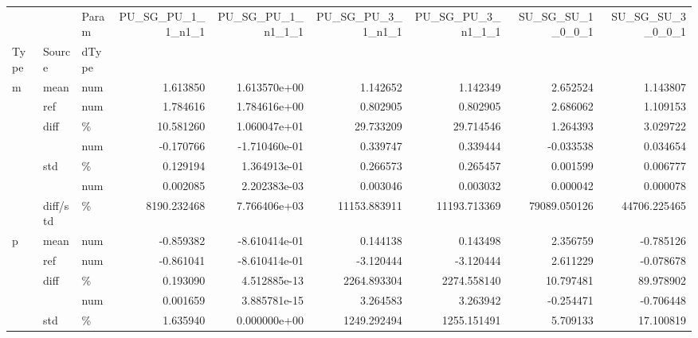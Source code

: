 \begin{tabular}{lllrrrrrr}
\toprule
   &          & Param &  PU\_SG\_PU\_1\_1\_n1\_1 &  PU\_SG\_PU\_1\_n1\_1\_1 &  PU\_SG\_PU\_3\_1\_n1\_1 &  PU\_SG\_PU\_3\_n1\_1\_1 &  SU\_SG\_SU\_1\_0\_0\_1 &  SU\_SG\_SU\_3\_0\_0\_1 \\
Type & Source & dType &                    &                    &                    &                    &                   &                   \\
\midrule
m & mean & num &           1.613850 &       1.613570e+00 &           1.142652 &           1.142349 &          2.652524 &          1.143807 \\
   & ref & num &           1.784616 &       1.784616e+00 &           0.802905 &           0.802905 &          2.686062 &          1.109153 \\
   & diff & \% &          10.581260 &       1.060047e+01 &          29.733209 &          29.714546 &          1.264393 &          3.029722 \\
   &          & num &          -0.170766 &      -1.710460e-01 &           0.339747 &           0.339444 &         -0.033538 &          0.034654 \\
   & std & \% &           0.129194 &       1.364913e-01 &           0.266573 &           0.265457 &          0.001599 &          0.006777 \\
   &          & num &           0.002085 &       2.202383e-03 &           0.003046 &           0.003032 &          0.000042 &          0.000078 \\
   & diff/std & \% &        8190.232468 &       7.766406e+03 &       11153.883911 &       11193.713369 &      79089.050126 &      44706.225465 \\
p & mean & num &          -0.859382 &      -8.610414e-01 &           0.144138 &           0.143498 &          2.356759 &         -0.785126 \\
   & ref & num &          -0.861041 &      -8.610414e-01 &          -3.120444 &          -3.120444 &          2.611229 &         -0.078678 \\
   & diff & \% &           0.193090 &       4.512885e-13 &        2264.893304 &        2274.558140 &         10.797481 &         89.978902 \\
   &          & num &           0.001659 &       3.885781e-15 &           3.264583 &           3.263942 &         -0.254471 &         -0.706448 \\
   & std & \% &           1.635940 &       0.000000e+00 &        1249.292494 &        1255.151491 &          5.709133 &         17.100819 \\

\end{tabular}
